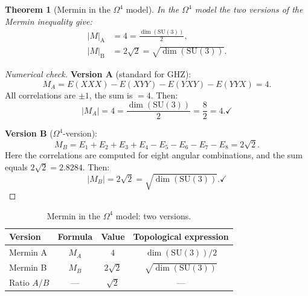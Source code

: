 \documentclass[11pt,a4paper]{article}
\newcommand{\SU}{\mathrm{SU}}
\newcommand{\Om}{\Omega^4}
\newtheorem{theorem}{Theorem}[section]
\theoremstyle{definition}
\begin{document}
\begin{theorem}[Mermin in the $\Om$ model]
\label{thm:mermin-omega4}
In the $\Om$ model the two versions of the Mermin inequality give:
\begin{align}
    |M|_{\text{A}} &= 4 = \frac{\dim(\SU(3))}{2}, 
    \label{eq:mermin-a} \\[0.3em]
    |M|_{\text{B}} &= 2\sqrt{2} = \sqrt{\dim(\SU(3))}.
    \label{eq:mermin-b}
\end{align}
\end{theorem}

\begin{proof}[Numerical check]
\medskip\noindent
\textbf{Version A} (standard for GHZ):
\begin{equation}
    M_A = E(XXX) - E(XYY) - E(YXY) - E(YYX) = 4.
\end{equation}
All correlations are $\pm 1$, the sum is $= 4$. Then:
\begin{equation}
    |M_A| = 4 = \frac{\dim(\SU(3))}{2} = \frac{8}{2} = 4. \checkmark
\end{equation}

\medskip\noindent
\textbf{Version B} ($\Om$-version):
\begin{equation}
    M_B = E_1 + E_2 + E_3 + E_4 - E_5 - E_6 - E_7 - E_8 
    = 2\sqrt{2}.
\end{equation}
Here the correlations are computed for eight angular combinations, 
and the sum equals $2\sqrt{2} = 2.8284$. Then:
\begin{equation}
    |M_B| = 2\sqrt{2} = \sqrt{\dim(\SU(3))}. \checkmark
\end{equation}
\end{proof}

\begin{table}[htbp]
\centering
\caption{Mermin in the $\Om$ model: two versions.}
\label{tab:mermin}
\begin{tabular}{lccc}
\toprule
Version & Formula & Value & Topological expression \\
\midrule
Mermin A & $M_A$ & $4$ & $\dim(\SU(3))/2$ \\
Mermin B & $M_B$ & $2\sqrt{2}$ & $\sqrt{\dim(\SU(3))}$ \\
\midrule
Ratio $A/B$ & --- & $\sqrt{2}$ & --- \\
\bottomrule
\end{tabular}
\end{table}
\end{document}
